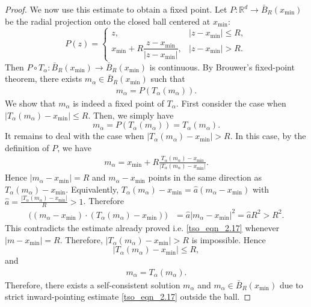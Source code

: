 \documentclass{article}
\numberwithin{equation}{section}
\begin{document}
\begin{proof}
We now use this estimate to obtain a fixed point. Let
$P:\mathbb R^d\to \bar{B}_R(x_{\min})$ be the radial projection onto
the closed ball centered at $x_{\min}$:
\begin{equation*}
    P(z)
    =
    \begin{cases}
    z, & |z-x_{\min}|\le R,\\
    x_{\min}     +     R\dfrac{z-x_{\min}}{|z-x_{\min}|},
    & |z-x_{\min}|>R.
    \end{cases}
\end{equation*}
Then $ P\circ T_\alpha:
    \bar{B}_R(x_{\min})
    \to     \bar{B}_R(x_{\min}) $ is continuous. By Brouwer's fixed-point theorem, there exists
$m_\alpha\in \bar{B}_R(x_{\min})$ such that
\begin{align*}
    m_\alpha=P(T_\alpha(m_\alpha)).
\end{align*}
We show  that $m_\alpha$ is indeed a fixed point of $T_\alpha$.
First consider the case when $|T_\alpha(m_\alpha)-x_{\min}|\le R$. Then, we simply have 
\begin{equation*}
    m_\alpha = P(T_\alpha(m_\alpha)) =     T_\alpha(m_\alpha).
\end{equation*}
It remains to deal with the case when $|T_\alpha(m_\alpha)-x_{\min}|>R$. 
In this case, by the definition of $P$, we have
\begin{align*}
     m_\alpha
    =  x_{\min} + R\frac{
        T_\alpha(m_\alpha)-x_{\min}}{|T_\alpha(m_\alpha)-x_{\min}|}.
\end{align*}
Hence $|m_\alpha-x_{\min}|=R$ and $m_\alpha-x_{\min}$ points in the same direction as
$T_\alpha(m_\alpha)-x_{\min}$. Equivalently, $T_\alpha(m_\alpha)-x_{\min} = \hat{a}(m_\alpha-x_{\min})$
 with $\hat{a} = \frac{|T_\alpha(m_\alpha)-x_{\min}|}{R} >1$. 
Therefore
\begin{align*}
    \big((m_\alpha-x_{\min})\cdot
    (T_\alpha(m_\alpha)-x_{\min}) \big)  &=
    \hat a |m_\alpha-x_{\min}|^2 = \hat{a} R^2 > R^2.
\end{align*}
This contradicts the estimate already proved i.e. \eqref{tso_eqn_2.17} whenever $|m-x_{\min}|=R$.
Therefore, $|T_\alpha(m_\alpha)-x_{\min}|>R$ is impossible.  Hence 
\begin{equation*}
    |T_\alpha(m_\alpha)-x_{\min}|\leq R,
\end{equation*} and
\begin{align}
    m_\alpha=T_\alpha(m_\alpha).
\end{align}
Therefore, there exists a self-consistent solution $m_\alpha$ and $m_\alpha \in \bar{B}_{R}(x_{\min})$ due to strict inward-pointing estimate \eqref{tso_eqn_2.17} outside the ball.





\end{proof}
\end{document}
